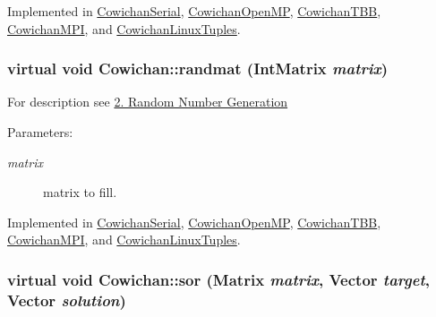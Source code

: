 Implemented in \hyperlink{class_cowichan_serial_00411b35445d7d3038b96d53e43bdffa}{CowichanSerial}, \hyperlink{class_cowichan_open_m_p_41d0067382570d1e784f62f2c5963d49}{CowichanOpenMP}, \hyperlink{class_cowichan_t_b_b_f3144458520e2dff1f9fad5753f6fc3d}{CowichanTBB}, \hyperlink{class_cowichan_m_p_i_1b7dccf774caccb26839cd29fe0a5cb0}{CowichanMPI}, and \hyperlink{class_cowichan_linux_tuples_c4874f09c54056ac94d00f9e341a94f4}{CowichanLinuxTuples}.\hypertarget{class_cowichan_c44cacf9d9e363a5b076bcee8b9a7a73}{
\subsubsection[{randmat}]{\setlength{\rightskip}{0pt plus 5cm}virtual void Cowichan::randmat ({\bf IntMatrix} {\em matrix})}}
\label{class_cowichan_c44cacf9d9e363a5b076bcee8b9a7a73}


For description see \hyperlink{index_randmat_sec}{2. Random Number Generation} \begin{Desc}
\item[Parameters:]
\begin{description}
\item[{\em matrix}]matrix to fill. \end{description}
\end{Desc}


Implemented in \hyperlink{class_cowichan_serial_2d24c0e562f7b109ec2ed916f38e5911}{CowichanSerial}, \hyperlink{class_cowichan_open_m_p_2c7c4e4dd96f82b7280a412c1fceed2c}{CowichanOpenMP}, \hyperlink{class_cowichan_t_b_b_b9b5cb4b4b5dc8907b2a01825cd4aaff}{CowichanTBB}, \hyperlink{class_cowichan_m_p_i_6805f21144aeaeddc4549e1b2b42bca8}{CowichanMPI}, and \hyperlink{class_cowichan_linux_tuples_ff90c6a27db51366570b70d352de7fab}{CowichanLinuxTuples}.\hypertarget{class_cowichan_92d8d9ae77208115fdfe69e1174f601c}{
\subsubsection[{sor}]{\setlength{\rightskip}{0pt plus 5cm}virtual void Cowichan::sor ({\bf Matrix} {\em matrix}, \/  {\bf Vector} {\em target}, \/  {\bf Vector} {\em solution})}}
\label{class_cowichan_92d8d9ae77208115fdfe69e1174f601c}


